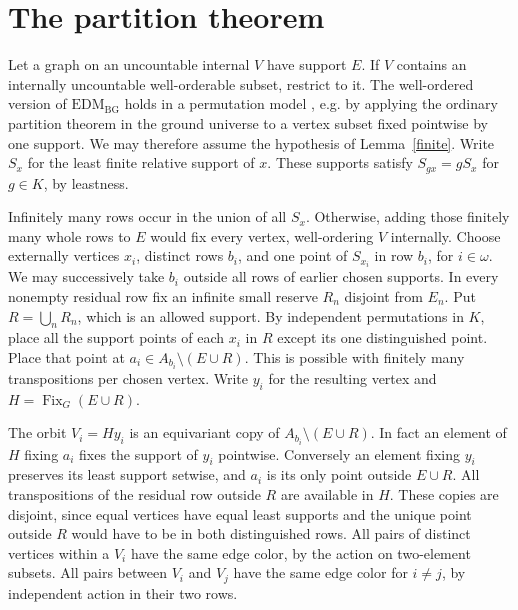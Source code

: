 \documentclass[11pt]{article}
\newcommand{\Fix}{\operatorname{Fix}}
\newcommand{\BG}{\mathrm{EDM}_{\mathrm{BG}}}
\begin{document}
\section{The partition theorem}
Let a graph on an uncountable internal $V$ have support $E$. If $V$ contains an internally uncountable well-orderable subset, restrict to it. The well-ordered version of $\BG$ holds in a permutation model \cite[Lemma~6.2]{ht}, e.g. by applying the ordinary partition theorem in the ground universe to a vertex subset fixed pointwise by one support. We may therefore assume the hypothesis of Lemma~\ref{finite}. Write $S_x$ for the least finite relative support of $x$. These supports satisfy $S_{gx}=gS_x$ for $g\in K$, by leastness.

Infinitely many rows occur in the union of all $S_x$. Otherwise, adding those finitely many whole rows to $E$ would fix every vertex, well-ordering $V$ internally. Choose externally vertices $x_i$, distinct rows $b_i$, and one point of $S_{x_i}$ in row $b_i$, for $i\in\omega$. We may successively take $b_i$ outside all rows of earlier chosen supports. In every nonempty residual row fix an infinite small reserve $R_n$ disjoint from $E_n$. Put $R=\bigcup_n R_n$, which is an allowed support. By independent permutations in $K$, place all the support points of each $x_i$ in $R$ except its one distinguished point. Place that point at $a_i\in A_{b_i}\setminus(E\cup R)$. This is possible with finitely many transpositions per chosen vertex. Write $y_i$ for the resulting vertex and $H=\Fix_G(E\cup R)$.

The orbit $V_i=Hy_i$ is an equivariant copy of $A_{b_i}\setminus(E\cup R)$. In fact an element of $H$ fixing $a_i$ fixes the support of $y_i$ pointwise. Conversely an element fixing $y_i$ preserves its least support setwise, and $a_i$ is its only point outside $E\cup R$. All transpositions of the residual row outside $R$ are available in $H$. These copies are disjoint, since equal vertices have equal least supports and the unique point outside $R$ would have to be in both distinguished rows. All pairs of distinct vertices within a $V_i$ have the same edge color, by the action on two-element subsets. All pairs between $V_i$ and $V_j$ have the same edge color for $i\ne j$, by independent action in their two rows.
\end{document}
